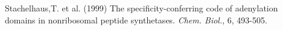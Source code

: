 \documentclass{bioinfo}
\begin{document}
\begin{thebibliography}{}
Stachelhaus,T. et al. (1999) The specificity-conferring code of adenylation domains in nonribosomal peptide synthetases. {\it Chem. Biol.}, 6, 493-505.
% 
% 
% 
% 
% 
% 

\end{thebibliography}
\end{document}
